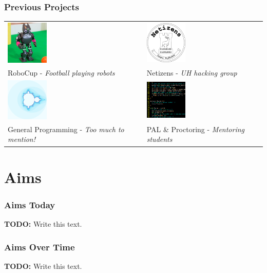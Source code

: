 \documentclass[10pt]{beamer}
\begin{document}
  \begin{frame}
    \frametitle{Previous Projects}
    \centering
    \begin{tabular}{p{4cm} p{4cm}}
      \includegraphics[width=2cm,keepaspectratio]{robocup.png}     &
      \includegraphics[width=2cm,keepaspectratio]{netizens.png}   \\
      RoboCup - \emph{Football playing robots}                     &
      Netizens - \emph{UH hacking group}                          \\
      \includegraphics[width=2cm,keepaspectratio]{mandelbrot.png}  &
      \includegraphics[width=2cm,keepaspectratio]{palproctor.png} \\
      General Programming - \emph{Too much to mention!}            &
      PAL \& Proctoring - \emph{Mentoring students}               \\
    \end{tabular}
  \end{frame}
  \section[Aims]{Aims}
  \begin{frame}
    \frametitle{Aims Today}
    \textbf{TODO:} Write this text.
  \end{frame}
  \begin{frame}
    \frametitle{Aims Over Time}
    \textbf{TODO:} Write this text.
  \end{frame}
\end{document}
